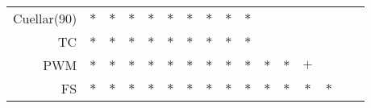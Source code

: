 \documentclass[landscape, 6pt]{report}
\begin{document}
\begin{table}[h!]
\begin{center}
\begin{tabular}{ rccccccccccccccc }
    Cuellar(90) & $*$ & $*$ & $*$ & $*$ & $*$ & $*$ & $*$ & $*$ & $*$ &     &     &     &     &     &     \\
    TC & $*$ & $*$ & $*$ & $*$ & $*$ & $*$ & $*$ & $*$ & $*$ &     &     &     &     &     &     \\
    PWM & $*$ & $*$ & $*$ & $*$ & $*$ & $*$ & $*$ & $*$ & $*$ & $*$ & $*$ & $+$ &     &     &     \\
    FS & $*$ & $*$ & $*$ & $*$ & $*$ & $*$ & $*$ & $*$ & $*$ & $*$ & $*$ & $*$ & $*$ &     &     \\
    \hline
  \end{tabular}
\end{center}
\vspace{0.0cm}
\end{table}
\end{document}
